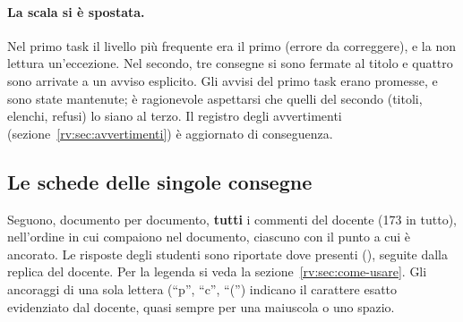 \paragraph{La scala si è spostata.} Nel primo task il livello più frequente
era il primo (errore da correggere), e la non lettura un'eccezione. Nel
secondo, tre consegne si sono fermate al titolo e quattro sono arrivate a un
avviso esplicito. Gli avvisi del primo task erano promesse, e sono state
mantenute; è ragionevole aspettarsi che quelli del secondo (titoli, elenchi,
refusi) lo siano al terzo. Il registro degli avvertimenti
(sezione~\ref{rv:sec:avvertimenti}) è aggiornato di conseguenza.

\subsection{Le schede delle singole consegne}
\label{rv:t2:sec:schede}

Seguono, documento per documento, \textbf{tutti} i commenti del docente (173
in tutto), nell'ordine in cui compaiono nel documento, ciascuno con il punto a
cui è ancorato. Le risposte degli studenti sono riportate dove presenti
(), seguite dalla replica del docente. Per la legenda si
veda la sezione~\ref{rv:sec:come-usare}. Gli ancoraggi di una sola lettera
(``p'', ``c'', ``('') indicano il carattere esatto evidenziato dal docente,
quasi sempre per una maiuscola o uno spazio.

